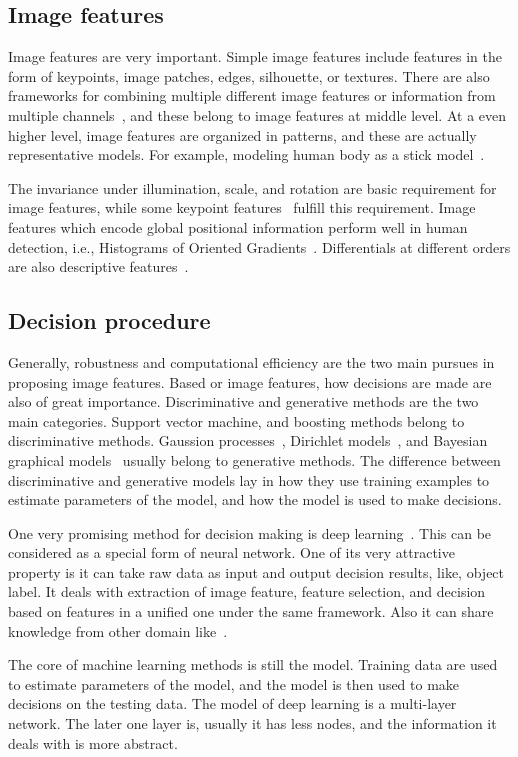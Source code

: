 \subsection{Image features}
Image features are very important. Simple image features include features in the form of keypoints, image patches, edges,  silhouette, or textures. There are also frameworks for combining multiple different image features or information from multiple channels~\cite{regionc,bgf}, and these belong to image features at middle level. At a even higher level, image features are organized in patterns, and these are actually representative models. For example, modeling human body as a stick model~\cite{stickb}.

The invariance under illumination, scale, and rotation are basic requirement for image features, while some keypoint features~\cite{ij2,o12,o14,o15,o2} fulfill this requirement. Image features which encode global positional information perform well in human detection, i.e., Histograms of Oriented
Gradients~\cite{ij4}. Differentials at different orders are also descriptive features~\cite{ij6}.

\subsection{Decision procedure}
Generally, robustness and computational efficiency are the two main pursues in proposing image features. Based or image features, how decisions are made are also of great importance. Discriminative and generative methods are the two main categories.
Support vector machine, and boosting methods belong to discriminative methods. Gaussion processes~\cite{gprocess}, Dirichlet models~\cite{lda,dp,hdp}, and Bayesian graphical models~\cite{bgm} usually belong to generative methods. The difference between discriminative and generative models lay in how they use training examples to estimate parameters of the model, and how the model is used to make decisions.

One very promising method for decision making is deep learning~\cite{dlearn}. This can be considered as a special form of neural network. One of its very attractive property is it can take raw data as input and output decision results, like, object label. It deals with extraction of image feature, feature selection, and decision based on features in a unified one under the same framework. Also it can share knowledge from other domain like~\cite{tlsurvey}. 

The core of machine learning methods is still the model. Training data are used to estimate  parameters of the model, and the model is then used to make decisions on the testing data. The model of deep learning is a multi-layer network. The later one layer is, usually it has less nodes, and the information it deals with is more abstract. 

